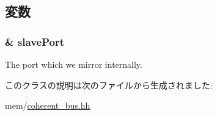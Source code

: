 \subsection{変数}
\hypertarget{classCoherentBus_1_1SnoopRespPort_af8e5dfce1f3b07a01c692d32d655bcf6}{
\subsubsection[{slavePort}]{\& {\bf slavePort}}}
\label{classCoherentBus_1_1SnoopRespPort_af8e5dfce1f3b07a01c692d32d655bcf6}
The port which we mirror internally. 

このクラスの説明は次のファイルから生成されました:\begin{DoxyCompactItemize}
\item 
mem/\hyperlink{coherent__bus_8hh}{coherent\_\-bus.hh}\end{DoxyCompactItemize}
